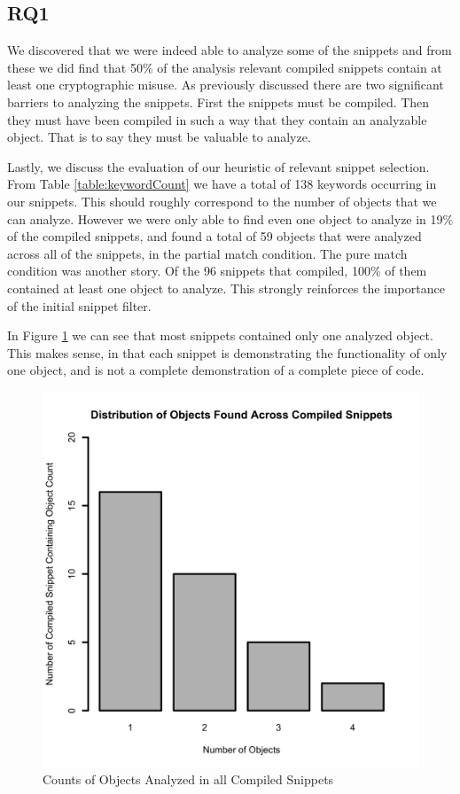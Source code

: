 \documentclass[10pt, conference]{IEEEtran}
\begin{document}
\subsection{RQ1}

We discovered that we were indeed able to analyze some of the snippets and from these we did find that 50\% of the analysis relevant compiled snippets contain at least one cryptographic misuse. As previously discussed there are two significant barriers to analyzing the snippets. First the snippets must be compiled. Then they must have been compiled in such a way that they contain an analyzable object. That is to say they must be valuable to analyze. 

Lastly, we discuss the evaluation of our heuristic of relevant snippet selection. From Table \ref{table:keywordCount} we have a total of 138 keywords occurring in our snippets. This should roughly correspond to the number of objects that we can analyze. However we were only able to find even one object to analyze in 19\% of the compiled snippets, and found a total of 59 objects that were analyzed across all of the snippets, in the partial match condition. The pure match condition was another story. Of the 96 snippets that compiled, 100\% of them contained at least one object to analyze. This strongly reinforces the importance of the initial snippet filter.


In Figure \ref{fig:objectDistribution} we can see that most snippets contained only one analyzed object. This makes sense, in that each snippet is demonstrating the functionality of only one object, and is not a complete demonstration of a complete piece of code. 
\begin{figure}[h]
\begin{center}
\includegraphics[width=0.9\linewidth]{ObjectDist.png}
\caption{Counts of Objects Analyzed in all Compiled Snippets}
\label{fig:objectDistribution}
\end{center}
\end{figure}
\end{document}
